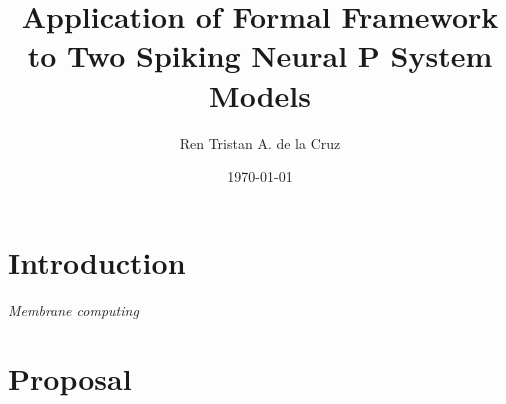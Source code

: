 \documentclass[12pt,A4]{article}
\title
{
   Application of Formal Framework to Two Spiking Neural P System Models 
}
\author
{
   Ren Tristan A. de la Cruz
}
\date
{
   \today
}
\begin{document}
\maketitle


\section{Introduction}

\emph{Membrane computing}


\section{Proposal}






\end{document}
